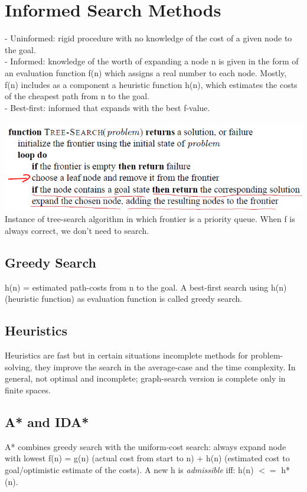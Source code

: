 \documentclass{article}
\begin{document}
\section{Informed Search Methods}
- Uninformed: rigid procedure with no knowledge of the cost of a given node to the goal.\\
- Informed: knowledge of the worth of expanding a node n is given in the form of an evaluation function f(n) which assigns a real number to each node. Mostly,
f(n) includes as a component a heuristic function h(n), which estimates the costs of the cheapest path from n to the goal.\\
- Best-first: informed that expands with the best f-value.\\\\
\includegraphics[scale=0.6]{18.png}
Instance of tree-search algorithm in which frontier is a priority queue. When f is always correct, we don't need to search.\\
\subsection{Greedy Search}
h(n) = estimated path-costs from n to the goal. A best-first search using h(n) (heuristic function) as evaluation function is called greedy search.
\subsection{Heuristics}
Heuristics are fast but in certain situations incomplete methods for problem-solving, they improve the search in the average-case and the time complexity. In general, not optimal and incomplete; graph-search version is complete only in finite spaces.
\subsection{A* and IDA*}
A* combines greedy search with the uniform-cost search: always expand node with lowest f(n) = g(n) (actual cost from start to n) + h(n) (estimated cost to goal/optimistic estimate of the costs). A new h is \textit{admissible} iff: h(n) $<=$ h*(n).
\end{document}
